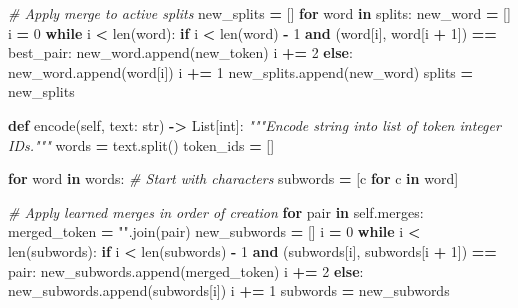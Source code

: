 \documentclass[
  letterpaper,
]{scrbook}
\newenvironment{Shaded}{\begin{snugshade}}{\end{snugshade}}
\newcommand{\BuiltInTok}[1]{#1}
\newcommand{\CommentTok}[1]{\textcolor[rgb]{0.56,0.35,0.01}{\textit{#1}}}
\newcommand{\ControlFlowTok}[1]{\textcolor[rgb]{0.13,0.29,0.53}{\textbf{#1}}}
\newcommand{\DecValTok}[1]{\textcolor[rgb]{0.00,0.00,0.81}{#1}}
\newcommand{\KeywordTok}[1]{\textcolor[rgb]{0.13,0.29,0.53}{\textbf{#1}}}
\newcommand{\NormalTok}[1]{#1}
\newcommand{\OperatorTok}[1]{\textcolor[rgb]{0.81,0.36,0.00}{\textbf{#1}}}
\newcommand{\StringTok}[1]{\textcolor[rgb]{0.31,0.60,0.02}{#1}}
\newcommand{\VariableTok}[1]{\textcolor[rgb]{0.00,0.00,0.00}{#1}}
\begin{document}
\begin{Shaded}
\begin{Highlighting}[]
            \CommentTok{\# Apply merge to active splits}
\NormalTok{            new\_splits }\OperatorTok{=}\NormalTok{ []}
            \ControlFlowTok{for}\NormalTok{ word }\KeywordTok{in}\NormalTok{ splits:}
\NormalTok{                new\_word }\OperatorTok{=}\NormalTok{ []}
\NormalTok{                i }\OperatorTok{=} \DecValTok{0}
                \ControlFlowTok{while}\NormalTok{ i }\OperatorTok{\textless{}} \BuiltInTok{len}\NormalTok{(word):}
                    \ControlFlowTok{if}\NormalTok{ i }\OperatorTok{\textless{}} \BuiltInTok{len}\NormalTok{(word) }\OperatorTok{{-}} \DecValTok{1} \KeywordTok{and}\NormalTok{ (word[i], word[i }\OperatorTok{+} \DecValTok{1}\NormalTok{]) }\OperatorTok{==}\NormalTok{ best\_pair:}
\NormalTok{                        new\_word.append(new\_token)}
\NormalTok{                        i }\OperatorTok{+=} \DecValTok{2}
                    \ControlFlowTok{else}\NormalTok{:}
\NormalTok{                        new\_word.append(word[i])}
\NormalTok{                        i }\OperatorTok{+=} \DecValTok{1}
\NormalTok{                new\_splits.append(new\_word)}
\NormalTok{            splits }\OperatorTok{=}\NormalTok{ new\_splits}

    \KeywordTok{def}\NormalTok{ encode(}\VariableTok{self}\NormalTok{, text: }\BuiltInTok{str}\NormalTok{) }\OperatorTok{{-}\textgreater{}}\NormalTok{ List[}\BuiltInTok{int}\NormalTok{]:}
        \CommentTok{"""Encode string into list of token integer IDs."""}
\NormalTok{        words }\OperatorTok{=}\NormalTok{ text.split()}
\NormalTok{        token\_ids }\OperatorTok{=}\NormalTok{ []}

        \ControlFlowTok{for}\NormalTok{ word }\KeywordTok{in}\NormalTok{ words:}
            \CommentTok{\# Start with characters}
\NormalTok{            subwords }\OperatorTok{=}\NormalTok{ [c }\ControlFlowTok{for}\NormalTok{ c }\KeywordTok{in}\NormalTok{ word]}

            \CommentTok{\# Apply learned merges in order of creation}
            \ControlFlowTok{for}\NormalTok{ pair }\KeywordTok{in} \VariableTok{self}\NormalTok{.merges:}
\NormalTok{                merged\_token }\OperatorTok{=} \StringTok{""}\NormalTok{.join(pair)}
\NormalTok{                new\_subwords }\OperatorTok{=}\NormalTok{ []}
\NormalTok{                i }\OperatorTok{=} \DecValTok{0}
                \ControlFlowTok{while}\NormalTok{ i }\OperatorTok{\textless{}} \BuiltInTok{len}\NormalTok{(subwords):}
                    \ControlFlowTok{if}\NormalTok{ i }\OperatorTok{\textless{}} \BuiltInTok{len}\NormalTok{(subwords) }\OperatorTok{{-}} \DecValTok{1} \KeywordTok{and}\NormalTok{ (subwords[i], subwords[i }\OperatorTok{+} \DecValTok{1}\NormalTok{]) }\OperatorTok{==}\NormalTok{ pair:}
\NormalTok{                        new\_subwords.append(merged\_token)}
\NormalTok{                        i }\OperatorTok{+=} \DecValTok{2}
                    \ControlFlowTok{else}\NormalTok{:}
\NormalTok{                        new\_subwords.append(subwords[i])}
\NormalTok{                        i }\OperatorTok{+=} \DecValTok{1}
\NormalTok{                subwords }\OperatorTok{=}\NormalTok{ new\_subwords}


\end{Highlighting}
\end{Shaded}
\end{document}
